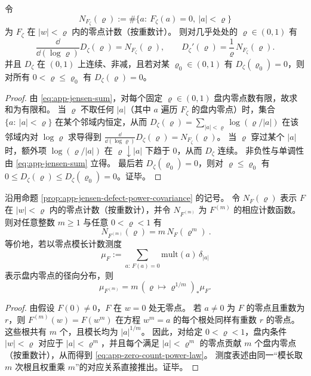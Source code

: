 \begin{proposition}\label{prop:app-jensen-defect-log-derivative}
令
\[
N_{F_{\zeta}}(\varrho)
:=\#\bigl\{a:\ F_{\zeta}(a)=0,\ |a|<\varrho\bigr\}
\]
为 \(F_{\zeta}\) 在 \(|w|<\varrho\) 内的零点计数（按重数计）。
则对几乎处处的 \(\varrho\in(0,1)\) 有
\[
\frac{\dd}{\dd(\log\varrho)}D_{\zeta}(\varrho)=N_{F_{\zeta}}(\varrho),
\qquad
D_{\zeta}'(\varrho)=\frac{1}{\varrho}\,N_{F_{\zeta}}(\varrho).
\]
并且 \(D_{\zeta}\) 在 \((0,1)\) 上连续、非减，且若对某 \(\varrho_0\in(0,1)\) 有 \(D_{\zeta}(\varrho_0)=0\)，则对所有 \(0<\varrho\le \varrho_0\) 有 \(D_{\zeta}(\varrho)=0\)。
\end{proposition}
\begin{proof}
由 \eqref{eq:app-jensen-sum}，对每个固定 \(\varrho\in(0,1)\) 盘内零点数有限，故求和为有限和。
当 \(\varrho\) 不取任何 \(|a|\)（其中 \(a\) 遍历 \(F_{\zeta}\) 的盘内零点）时，集合 \(\{a:\ |a|<\varrho\}\) 在某个邻域内恒定，从而
\(
D_{\zeta}(\varrho)=\sum_{|a|<\varrho}\log(\varrho/|a|)
\)
在该邻域内对 \(\log\varrho\) 求导得到 \(\frac{\dd}{\dd(\log\varrho)}D_{\zeta}(\varrho)=N_{F_{\zeta}}(\varrho)\)。
当 \(\varrho\) 穿过某个 \(|a|\) 时，额外项 \(\log(\varrho/|a|)\) 在 \(\varrho\downarrow |a|\) 下趋于 \(0\)，从而 \(D_{\zeta}\) 连续。
非负性与单调性由 \eqref{eq:app-jensen-sum} 立得。
最后若 \(D_{\zeta}(\varrho_0)=0\)，则对 \(\varrho\le \varrho_0\) 有 \(0\le D_{\zeta}(\varrho)\le D_{\zeta}(\varrho_0)=0\)。证毕。
\end{proof}

\begin{corollary}\label{cor:app-jensen-zero-count-power-law}
沿用命题 \ref{prop:app-jensen-defect-power-covariance} 的记号。
令 \(N_F(\varrho)\) 表示 \(F\) 在 \(|w|<\varrho\) 内的零点计数（按重数计），并令 \(N_{F^{(m)}}\) 为 \(F^{(m)}\) 的相应计数函数。
则对任意整数 \(m\ge 1\) 与任意 \(0<\varrho<1\) 有
\begin{equation}\label{eq:app-zero-count-power-law}
\boxed{\ N_{F^{(m)}}(\varrho)=m\,N_F(\varrho^m)\ }.
\end{equation}
等价地，若以零点模长计数测度
\[
\mu_F:=\sum_{a:\,F(a)=0}\mathrm{mult}(a)\,\delta_{|a|}
\]
表示盘内零点的径向分布，则
\[
\mu_{F^{(m)}}=m\,(\varrho\mapsto \varrho^{1/m})_{\ast}\mu_F.
\]
\end{corollary}
\begin{proof}
由假设 \(F(0)\neq 0\)，\(F\) 在 \(w=0\) 处无零点。
若 \(a\neq 0\) 为 \(F\) 的零点且重数为 \(r\)，则 \(F^{(m)}(w)=F(w^m)\) 在方程 \(w^m=a\) 的每个根处同样有重数 \(r\) 的零点。
这些根共有 \(m\) 个，且模长均为 \(|a|^{1/m}\)。
因此，对给定 \(0<\varrho<1\)，盘内条件 \(|w|<\varrho\) 对应于 \(|a|<\varrho^m\)，并且每个满足 \(|a|<\varrho^m\) 的零点贡献 \(m\) 个盘内零点（按重数计），从而得到 \eqref{eq:app-zero-count-power-law}。
测度表述由同一“模长取 \(m\) 次根且权重乘 \(m\)”的对应关系直接推出。证毕。
\end{proof}

